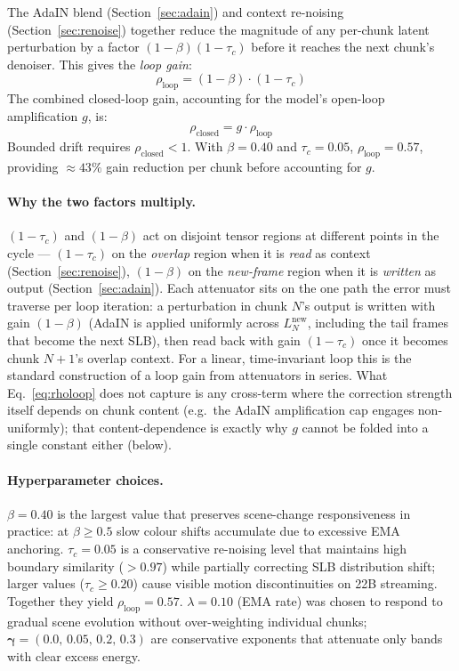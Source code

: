 \documentclass[12pt]{article}
\begin{document}
The AdaIN blend (Section~\ref{sec:adain}) and context re-noising
(Section~\ref{sec:renoise}) together reduce the magnitude of any per-chunk
latent perturbation by a factor $(1-\beta)(1-\tau_c)$ before it reaches the
next chunk's denoiser.  This gives the \emph{loop gain}:
\begin{equation}
\rho_{\text{loop}} = (1-\beta)\cdot(1-\tau_c)
\label{eq:rholoop}
\end{equation}
The combined closed-loop gain, accounting for the model's open-loop
amplification $g$, is:
\begin{equation}
\rho_{\text{closed}} = g \cdot \rho_{\text{loop}}
\end{equation}
Bounded drift requires $\rho_{\text{closed}} < 1$.  With $\beta=0.40$ and
$\tau_c=0.05$, $\rho_{\text{loop}} = 0.57$, providing $\approx43\%$ gain
reduction per chunk before accounting for $g$.

\paragraph{Why the two factors multiply.}  $(1-\tau_c)$ and $(1-\beta)$ act on
disjoint tensor regions at different points in the cycle --- $(1-\tau_c)$ on
the \emph{overlap} region when it is \emph{read} as context
(Section~\ref{sec:renoise}), $(1-\beta)$ on the \emph{new-frame} region when it
is \emph{written} as output (Section~\ref{sec:adain}).  Each attenuator sits
on the one path the error must traverse per loop iteration: a perturbation in
chunk $N$'s output is written with gain $(1-\beta)$ (AdaIN is applied uniformly
across $L_N^{\text{new}}$, including the tail frames that become the next
SLB), then read back with gain $(1-\tau_c)$ once it becomes chunk $N{+}1$'s
overlap context.  For a linear, time-invariant loop this is the standard
construction of a loop gain from attenuators in series.  What
Eq.~\eqref{eq:rholoop} does not capture is any cross-term where the correction
strength itself depends on chunk content (e.g.\ the AdaIN amplification cap
engages non-uniformly); that content-dependence is exactly why $g$ cannot be
folded into a single constant either (below).

\paragraph{Hyperparameter choices.}
$\beta=0.40$ is the largest value that preserves scene-change responsiveness in
practice: at $\beta\geq0.5$ slow colour shifts accumulate due to excessive EMA
anchoring.  $\tau_c=0.05$ is a conservative re-noising level that maintains
high boundary similarity ($>0.97$) while partially correcting SLB distribution
shift; larger values ($\tau_c\geq0.20$) cause visible motion discontinuities on
22B streaming.  Together they yield $\rho_{\text{loop}}=0.57$.
$\lambda=0.10$ (EMA rate) was chosen to respond to gradual scene evolution
without over-weighting individual chunks; $\boldsymbol\gamma=(0.0,\,0.05,\,0.2,\,0.3)$
are conservative exponents that attenuate only bands with clear excess energy.
\end{document}
